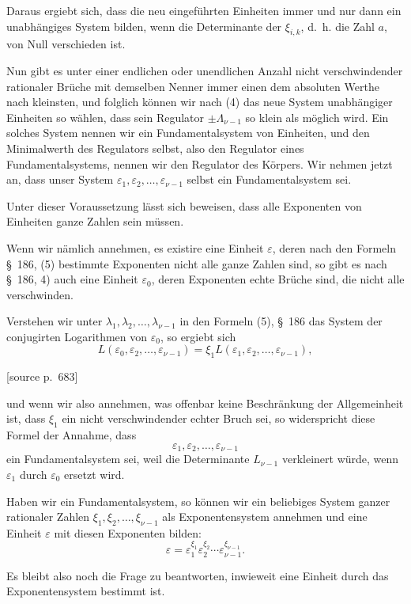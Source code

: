 \documentclass[11pt]{article}
\newcommand{\srcpage}[1]{\par\medskip\noindent\textsf{[source p.~#1]}\par\smallskip}
\begin{document}
Daraus ergiebt sich, dass die neu eingeführten Einheiten immer und nur dann ein unabhängiges System bilden, wenn die Determinante der $\xi_{i,k}$, d.~h. die Zahl $a$, von Null verschieden ist.

Nun gibt es unter einer endlichen oder unendlichen Anzahl nicht verschwindender rationaler Brüche mit demselben Nenner immer einen dem absoluten Werthe nach kleinsten, und folglich können wir nach (4) das neue System unabhängiger Einheiten so wählen, dass sein Regulator $\pm\Lambda_{\nu-1}$ so klein als möglich wird. Ein solches System nennen wir ein Fundamentalsystem von Einheiten, und den Minimalwerth des Regulators selbst, also den Regulator eines Fundamentalsystems, nennen wir den Regulator des Körpers. Wir nehmen jetzt an, dass unser System $\varepsilon_1,\varepsilon_2,\ldots,\varepsilon_{\nu-1}$ selbst ein Fundamentalsystem sei.

Unter dieser Voraussetzung lässt sich beweisen, dass alle Exponenten von Einheiten ganze Zahlen sein müssen.

Wenn wir nämlich annehmen, es existire eine Einheit $\varepsilon$, deren nach den Formeln \S~186, (5) bestimmte Exponenten nicht alle ganze Zahlen sind, so gibt es nach \S~186, 4) auch eine Einheit $\varepsilon_0$, deren Exponenten echte Brüche sind, die nicht alle verschwinden.

Verstehen wir unter $\lambda_1,\lambda_2,\ldots,\lambda_{\nu-1}$ in den Formeln (5), \S~186 das System der conjugirten Logarithmen von $\varepsilon_0$, so ergiebt sich
\[
L(\varepsilon_0,\varepsilon_2,\ldots,\varepsilon_{\nu-1})=\xi_1L(\varepsilon_1,\varepsilon_2,\ldots,\varepsilon_{\nu-1}),
\]
\srcpage{683}
und wenn wir also annehmen, was offenbar keine Beschränkung der Allgemeinheit ist, dass $\xi_1$ ein nicht verschwindender echter Bruch sei, so widerspricht diese Formel der Annahme, dass
\[
\varepsilon_1,\varepsilon_2,\ldots,\varepsilon_{\nu-1}
\]
ein Fundamentalsystem sei, weil die Determinante $L_{\nu-1}$ verkleinert würde, wenn $\varepsilon_1$ durch $\varepsilon_0$ ersetzt wird.

Haben wir ein Fundamentalsystem, so können wir ein beliebiges System ganzer rationaler Zahlen $\xi_1,\xi_2,\ldots,\xi_{\nu-1}$ als Exponentensystem annehmen und eine Einheit $\varepsilon$ mit diesen Exponenten bilden:
\[
\varepsilon=\varepsilon_1^{\xi_1}\varepsilon_2^{\xi_2}\cdots\varepsilon_{\nu-1}^{\xi_{\nu-1}}.
\]

Es bleibt also noch die Frage zu beantworten, inwieweit eine Einheit durch das Exponentensystem bestimmt ist.
\end{document}
